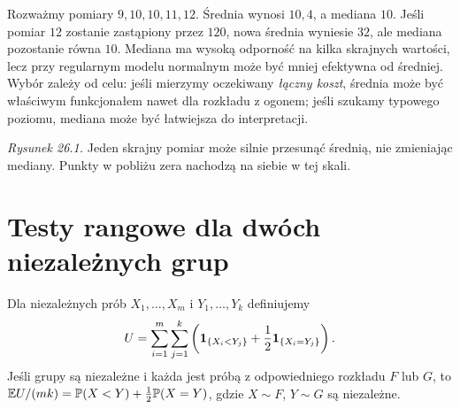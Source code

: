 \begin{przyklad}
Rozważmy pomiary $9,10,10,11,12$. Średnia wynosi $10{,}4$,
a mediana $10$. Jeśli pomiar $12$ zostanie zastąpiony
przez $120$, nowa średnia wyniesie $32$, ale mediana
pozostanie równa $10$. Mediana ma wysoką odporność
na kilka skrajnych wartości, lecz przy regularnym modelu
normalnym może być mniej efektywna od średniej.
Wybór zależy od celu: jeśli mierzymy oczekiwany
\emph{łączny koszt}, średnia może być właściwym funkcjonałem
nawet dla rozkładu z ogonem; jeśli szukamy typowego
poziomu, mediana może być łatwiejsza do interpretacji.
\end{przyklad}

\begin{center}

{\small\emph{Rysunek 26.1.} Jeden skrajny pomiar może silnie przesunąć średnią,\newline
nie zmieniając mediany. Punkty w pobliżu zera nachodzą na siebie w tej skali.}
\end{center}

\section{Testy rangowe dla dwóch niezależnych grup}
\begin{definicja}
\label{def:mann-whitney}
Dla niezależnych prób $X_1,\ldots,X_m$ i
$Y_1,\ldots,Y_k$ definiujemy
\[
 U=\sum_{i=1}^m\sum_{j=1}^k
 \left(\mathbf 1_{\{X_i<Y_j\}}+
 \frac12\mathbf 1_{\{X_i=Y_j\}}\right).
\]
Jeśli grupy są niezależne i każda jest próbą
z odpowiedniego rozkładu $F$ lub $G$, to
$\mathbb E U/(mk)=\mathbb P(X<Y)+\tfrac12\mathbb P(X=Y)$,
gdzie $X\sim F$, $Y\sim G$ są niezależne.
\end{definicja}

